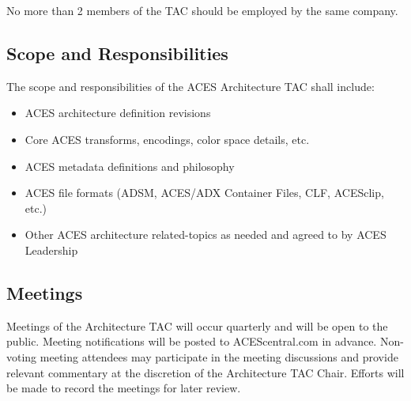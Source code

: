 No more than 2 members of the TAC should be employed by the same company.

\subsection{Scope and Responsibilities}
The scope and responsibilities of the ACES Architecture TAC shall include:

\begin{itemize}
    \item ACES architecture definition revisions
    \item Core ACES transforms, encodings, color space details, etc.
    \item ACES metadata definitions and philosophy
    \item ACES file formats (ADSM, ACES/ADX Container Files, CLF, ACESclip, etc.)
    \item Other ACES architecture related-topics as needed and agreed to by ACES Leadership
\end{itemize}

\subsection{Meetings}
Meetings of the Architecture TAC will occur quarterly and will be open to the public. Meeting notifications will be posted to ACEScentral.com in advance. Non-voting meeting attendees may participate in the meeting discussions and provide relevant commentary at the discretion of the Architecture TAC Chair. Efforts will be made to record the meetings for later review. 